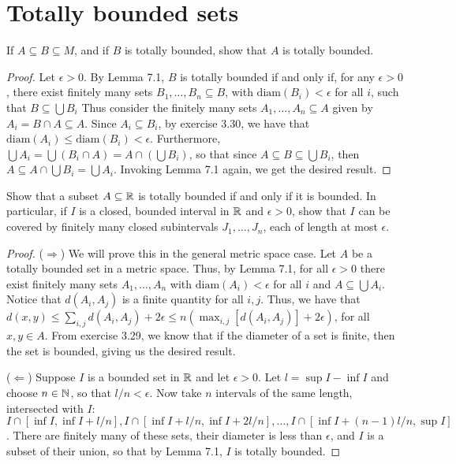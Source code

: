 \section{Totally bounded sets}


\begin{exercise}{1}
If $A\subseteq B\subseteq M$, and if $B$ is totally bounded, show that $A$ is totally bounded.
\end{exercise}
\begin{proof}
Let $\epsilon>0$.
By Lemma 7.1, $B$ is totally bounded if and only if, for any $\epsilon>0$, there exist finitely many sets $B_1,\dots,B_n\subseteq B$, with $\text{diam}(B_i)<\epsilon$ for all $i$, such that $B\subseteq \bigcup B_i$
Thus consider the finitely many sets $A_1,\dots,A_n\subseteq A$ given by $A_i = B\cap A \subseteq A$.
Since $A_i\subseteq B_i$, by exercise 3.30, we have that $\text{diam}(A_i)\leq \text{diam}(B_i)< \epsilon$.
Furthermore, $\bigcup A_i = \bigcup (B_i\cap A) = A\cap(\bigcup B_i)$, so that since $A\subseteq B\subseteq \bigcup B_i$, then $A\subseteq A\cap \bigcup B_i = \bigcup A_i$.
Invoking Lemma 7.1 again, we get the desired result.
\end{proof} 

\begin{exercise}{2}
Show that a subset $A\subseteq \mathbb{R}$ is totally bounded if and only if it is bounded.
In particular, if $I$ is a closed, bounded interval in $\mathbb{R}$ and $\epsilon>0$, show that $I$ can be covered by finitely many closed subintervals $J_1,\dots,J_n$, each of length at most $\epsilon$.
\end{exercise}
\begin{proof}
($\Rightarrow$)
We will prove this in the general metric space case.
Let $A$ be a totally bounded set in a metric space.
Thus, by Lemma 7.1, for all $\epsilon>0$ there exist finitely many sets $A_1,\dots,A_n$ with $\text{diam}(A_i) < \epsilon$ for all $i$ and $A\subseteq\bigcup A_i$.
Notice that $d(A_i,A_j)$ is a finite quantity for all $i,j$.
Thus, we have that $d(x,y)\leq \sum_{i,j}d(A_i,A_j)+2\epsilon \leq n(\max_{i,j}[d(A_i,A_j)]+ 2\epsilon)$, for all $x,y\in A$.
From exercise 3.29, we know that if the diameter of a set is finite, then the set is bounded, giving us the desired result.

($\Leftarrow$)
Suppose $I$ is a bounded set in $\mathbb{R}$ and let $\epsilon>0$.
Let $l = \sup I-\inf I$ and choose $n\in\mathbb{N}$, so that $l/n<\epsilon$.
Now take $n$ intervals of the same length, intersected with $I$: $I\cap [\inf I, \inf I+l/n], I\cap [\inf I+l/n, \inf I +2l/n],\dots, I\cap [\inf I +(n-1)l/n, \sup I]$.
There are finitely many of these sets, their diameter is less than $\epsilon$, and $I$ is a subset of their union, so that by Lemma 7.1, $I$ is totally bounded.
\end{proof} 

